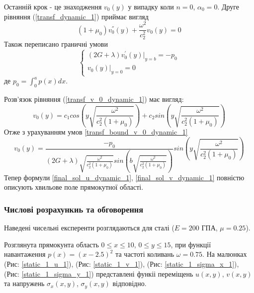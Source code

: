 Останній крок - це знаходження $v_0(y)$ у випадку коли $n=0$, $\alpha_0 =0$.
Друге рівняння (\ref{transf_dynamic_1}) приймає вигляд
\begin{equation}\label{transf_v_0_dynamic_1}
    (1 + \mu_0) v_0^{''}(y) + \frac{\omega^2}{c_2^2}v_0(y) = 0
\end{equation}
Також переписано граничні умови
\begin{equation}\label{transf_bound_v_0_dynamic_1}
    \begin{cases}
        (2G + \lambda)v_0^{'}(y)|_{y=b} = -p_0 \\
        v_0(y)|_{y=0} = 0
    \end{cases}
\end{equation}
де $p_0 = \int_{0}^{a}p(x)dx$.

Розв'язок рівняння (\ref{transf_v_0_dynamic_1}) має вигляд:
\begin{equation}
    v_0(y) = c_1 cos \left(y \sqrt{\frac{\omega^2}{c_2^2(1 + \mu_0)}} \right) + c_2 sin \left( y \sqrt{\frac{\omega^2}{c_2^2(1 + \mu_0)}} \right)
\end{equation}
Отже з урахуванням умов \eqref{transf_bound_v_0_dynamic_1}
\begin{equation}
    v_0(y) = \frac{-p_0}{(2G + \lambda) \sqrt{\frac{\omega^2}{c_2^2(1 + \mu_0)}} sin \left(b \sqrt{\frac{\omega^2}{c_2^2(1 + \mu_0)}} \right) } sin \left(y \sqrt{\frac{\omega^2}{c_2^2(1 + \mu_0)}} \right)
\end{equation}
Тепер формули \eqref{final_sol_u_dynamic_1}, \eqref{final_sol_v_dynamic_1} повністю описують хвильове поле прямокутної області.

\subsubsection{Числові розрахункиь та обговорення}
Наведені чисельні експеренти розглядаються для сталі ($E=200$ ГПА, $\mu=0.25$).

Розглянута прямокунта область $0 \le x \le 10$, $0 \le y \le 15$, при функції навантаження $p(x)=(x-2.5)^2$ та частоті коливань $\omega=0.75$.
На малюнках (Рис: \ref{static_1_u_1}), (Рис: \ref{static_1_v_1}), (Рис: \ref{static_1_sigma_x_1}), (Рис: \ref{static_1_sigma_y_1})
представлені функіі переміщень $u(x,y)$, $v(x,y)$ та напружень $\sigma_x(x,y)$, $\sigma_y(x,y)$ відповідно.
